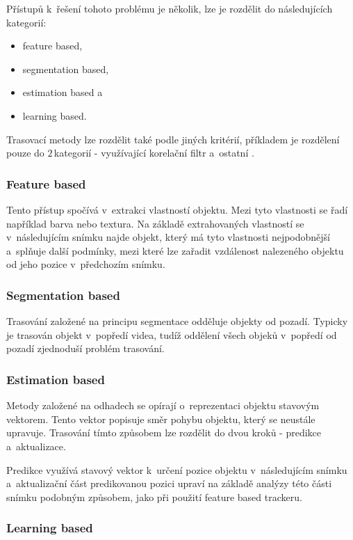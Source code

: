 Přístupů k~řešení tohoto problému je několik, lze je rozdělit do následujících kategorií:
\begin{itemize}
    \item feature based,
    \item segmentation based,
    \item estimation based a
    \item learning based.
\end{itemize}

Trasovací metody lze rozdělit také podle jiných kritérií, příkladem je rozdělení pouze do $2$\,\rm kategorií - využívající korelační filtr a~ostatní \citep{}.

\subsubsection{Feature based}

Tento přístup spočívá v~extrakci vlastností objektu. Mezi tyto vlastnosti se řadí například barva nebo textura. Na základě extrahovaných vlastností se v~následujícím snímku najde objekt, který má tyto vlastnosti nejpodobnější a~splňuje další podmínky, mezi které lze zařadit vzdálenost nalezeného objektu od jeho pozice v~předchozím snímku.

\subsubsection{Segmentation based}

Trasování založené na principu segmentace odděluje objekty od pozadí. Typicky je trasován objekt v~popředí videa, tudíž oddělení všech objeků v~popředí od pozadí zjednoduší problém trasování.

\subsubsection{Estimation based}

Metody založené na odhadech se opírají o~reprezentaci objektu stavovým vektorem. Tento vektor popisuje směr pohybu objektu, který se neustále upravuje. Trasování tímto způsobem lze rozdělit do dvou kroků - predikce a~aktualizace.

Predikce využívá stavový vektor k~určení pozice objektu v~následujícím snímku a~aktualizační část predikovanou pozici upraví na základě analýzy této části snímku podobným způsobem, jako při použití feature based trackeru.

\subsubsection{Learning based}

